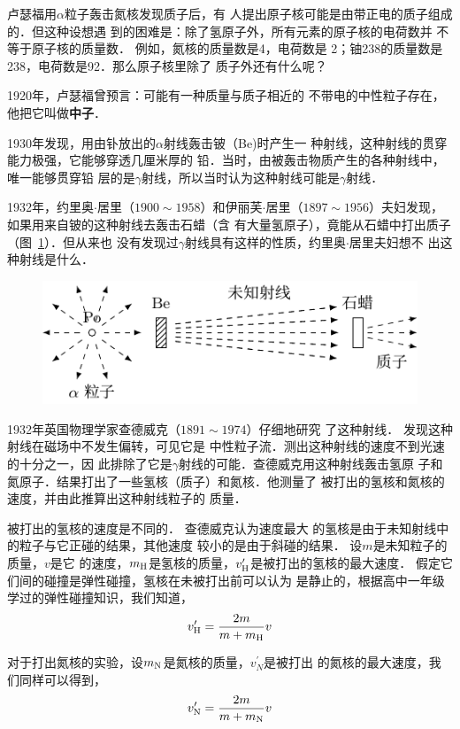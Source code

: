 卢瑟福用$\alpha$粒子轰击氮核发现质子后，有
人提出原子核可能是由带正电的质子组成的．但这种设想遇
到的困难是：除了氢原子外，所有元素的原子核的电荷数并
不等于原子核的质量数．
例如，氮核的质量数是4，电荷数是
2；铀238的质量数是238，电荷数是92．那么原子核里除了
质子外还有什么呢？

1920年，卢瑟福曾预言：可能有一种质量与质子相近的
不带电的中性粒子存在，他把它叫做\textbf{中子}．

1930年发现，用由钋放出的$\alpha$射线轰击铍（Be)时产生一
种射线，这种射线的贯穿能力极强，它能够穿透几厘米厚的
铅．当时，由被轰击物质产生的各种射线中，唯一能够贯穿铅
层的是$\gamma$射线，所以当时认为这种射线可能是$\gamma$射线．

1932年，约里奥$\cdot$居里（$1900 \sim 1958$）和伊丽芙$\cdot$居里（$1897 \sim 1956$）夫妇发现，如果用来自铍的这种射线去轰击石蜡（含
有大量氢原子），竟能从石蜡中打出质子（图~\ref{fig_C_9-8}）．但从来也
没有发现过$\gamma$射线具有这样的性质，约里奥$\cdot$居里夫妇想不
出这种射线是什么．
\begin{figure}[htbp]
    \centering
    \includegraphics{fig/C/9-8.pdf}
    \caption{}\label{fig_C_9-8}
\end{figure}

1932年英国物理学家查德威克（$1891 \sim 1974$）仔细地研究
了这种射线．
发现这种射线在磁场中不发生偏转，可见它是
中性粒子流．测出这种射线的速度不到光速的十分之一，因
此排除了它是$\gamma$射线的可能．查德威克用这种射线轰击氢原
子和氮原子．结果打出了一些氢核（质子）和氮核．他测量了
被打出的氢核和氮核的速度，并由此推算出这种射线粒子的
质量．

被打出的氢核的速度是不同的．
查德威克认为速度最大
的氢核是由于未知射线中的粒子与它正碰的结果，其他速度
较小的是由于斜碰的结果．
设$m$是未知粒子的质量，$v$是它
的速度，$m_{\rm H}$是氢核的质量，$v'_{\rm H}$是被打出的氢核的最大速度．
假定它们间的碰撞是弹性碰撞，氢核在未被打出前可以认为
是静止的，根据高中一年级学过的弹性碰撞知识，我们知道，
\[ v'_{\rm H}=\frac{2m}{m+m_{\rm H}}v \]

对于打出氮核的实验，设$m_{\rm N}$是氮核的质量，$v^{\prime}_N$是被打出
的氮核的最大速度，我们同样可以得到，
\[ v'_{\rm N}=\frac{2m}{m+m_{\rm N}}v\]


